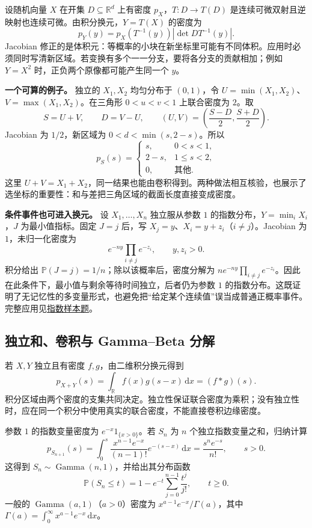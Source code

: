 \documentclass[UTF8,12pt,a4paper,fontset=fandol]{ctexbook}
\begin{document}
\label{app:probability-transforms}

设随机向量 $X$ 在开集 $D\subseteq\mathbb R^d$ 上有密度 $p_X$，$T:D\to T(D)$ 是连续可微双射且逆映射也连续可微。由积分换元，$Y=T(X)$ 的密度为
\[
p_Y(y)=p_X(T^{-1}(y))\left|\det DT^{-1}(y)\right|.
\]
Jacobian 修正的是体积元：等概率的小块在新坐标里可能有不同体积。应用时必须同时写清新区域。若变换有多个一一分支，要将各分支的贡献相加；例如 $Y=X^2$ 时，正负两个原像都可能产生同一个 $y$。

\textbf{一个可算的例子。} 独立的 $X_1,X_2$ 均匀分布于 $(0,1)$，令 $U=\min(X_1,X_2)$、$V=\max(X_1,X_2)$。在三角形 $0<u<v<1$ 上联合密度为 $2$。取
\[
S=U+V,\qquad D=V-U,
\qquad (U,V)=\left(\frac{S-D}{2},\frac{S+D}{2}\right).
\]
Jacobian 为 $1/2$，新区域为 $0<d<\min(s,2-s)$。所以
\[
p_S(s)=\begin{cases}s,&0<s<1,\\2-s,&1\le s<2,\\0,&\text{其他}.
\end{cases}
\]
这里 $U+V=X_1+X_2$，同一结果也能由卷积得到。两种做法相互核验，也展示了选坐标的重要性：和与差把三角区域的截面长度直接变成密度。

\textbf{条件事件也可进入换元。} 设 $X_1,\ldots,X_n$ 独立服从参数 $1$ 的指数分布，$Y=\min_iX_i$，$J$ 为最小值指标。固定 $J=j$ 后，写 $X_j=y$、$X_i=y+z_i$（$i\ne j$）。Jacobian 为 $1$，未归一化密度为
\[
e^{-ny}\prod_{i\ne j}e^{-z_i},\qquad y,z_i>0.
\]
积分给出 $\mathbb P(J=j)=1/n$；除以该概率后，密度分解为 $ne^{-ny}\prod_{i\ne j}e^{-z_i}$。因此在此条件下，最小值与剩余等待时间独立，后者仍为参数 $1$ 的指数分布。这既证明了无记忆性的多变量形式，也避免把“给定某个连续值”误当成普通正概率事件。完整应用见\hyperref[pr:fin16-high:12]{指数样本题}。

\subsection{独立和、卷积与 Gamma–Beta 分解}

\label{app:probability-convolution}

若 $X,Y$ 独立且有密度 $f,g$，由二维积分换元得到
\[
p_{X+Y}(s)=\int_{\mathbb R}f(x)g(s-x)\,\mathrm dx=(f*g)(s).
\]
积分区域由两个密度的支集共同决定。独立性保证联合密度为乘积；没有独立性时，应在同一个积分中使用真实的联合密度，不能直接卷积边缘密度。

参数 $1$ 的指数变量密度为 $e^{-x}1_{\{x>0\}}$。若 $S_n$ 为 $n$ 个独立指数变量之和，归纳计算
\[
p_{S_{n+1}}(s)=\int_0^s\frac{x^{n-1}e^{-x}}{(n-1)!}e^{-(s-x)}\,\mathrm dx
=\frac{s^ne^{-s}}{n!},\qquad s>0.
\]
这得到 $S_n\sim\operatorname{Gamma}(n,1)$，并给出其分布函数
\[
\mathbb P(S_n\le t)=1-e^{-t}\sum_{j=0}^{n-1}\frac{t^j}{j!},\qquad t\ge0.
\]
一般的 $\operatorname{Gamma}(a,1)$（$a>0$）密度为 $x^{a-1}e^{-x}/\Gamma(a)$，其中 $\Gamma(a)=\int_0^\infty x^{a-1}e^{-x}\,\mathrm dx$。
\end{document}
